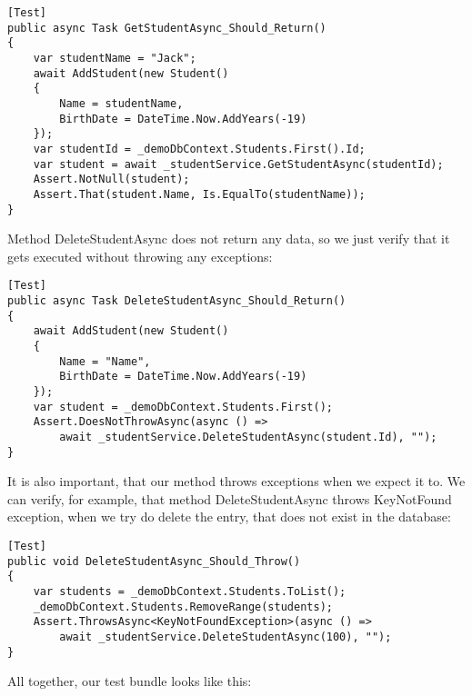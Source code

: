 \begin{lstlisting}
[Test]
public async Task GetStudentAsync_Should_Return()
{
    var studentName = "Jack";
    await AddStudent(new Student()
    {
        Name = studentName,
        BirthDate = DateTime.Now.AddYears(-19)
    });
    var studentId = _demoDbContext.Students.First().Id;
    var student = await _studentService.GetStudentAsync(studentId);
    Assert.NotNull(student);
    Assert.That(student.Name, Is.EqualTo(studentName));
}
\end{lstlisting}

Method DeleteStudentAsync does not return any data, so we just verify that it gets executed without throwing any exceptions:

\begin{lstlisting}
[Test]
public async Task DeleteStudentAsync_Should_Return()
{
    await AddStudent(new Student()
    {
        Name = "Name",
        BirthDate = DateTime.Now.AddYears(-19)
    });
    var student = _demoDbContext.Students.First();
    Assert.DoesNotThrowAsync(async () =>
        await _studentService.DeleteStudentAsync(student.Id), "");
}
\end{lstlisting}

It is also important, that our method throws exceptions when we expect it to. We can verify, for example, that method DeleteStudentAsync throws KeyNotFound exception, when we try do delete the entry, that does not exist in the database:

\begin{lstlisting}
[Test]
public void DeleteStudentAsync_Should_Throw()
{
    var students = _demoDbContext.Students.ToList();
    _demoDbContext.Students.RemoveRange(students);
    Assert.ThrowsAsync<KeyNotFoundException>(async () =>
        await _studentService.DeleteStudentAsync(100), "");
}
\end{lstlisting}

All together, our test bundle looks like this:

